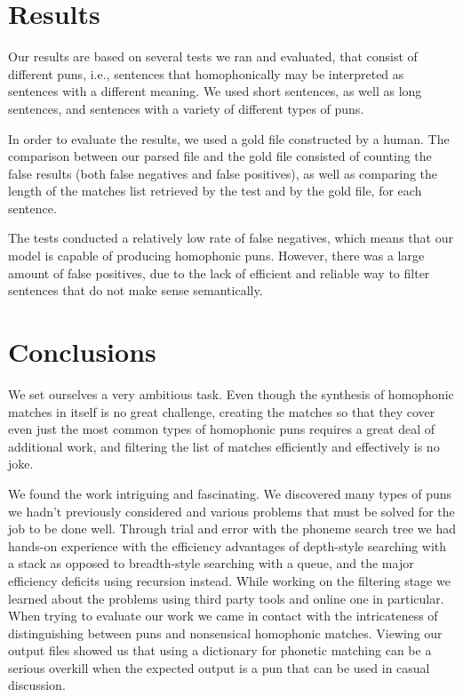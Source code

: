 \documentclass[11pt,a4paper]{article}
\begin{document}
\section{Results}
Our results are based on several tests we ran and evaluated, that consist of different puns, i.e., sentences that homophonically may be interpreted as sentences with a different meaning. We used short sentences, as well as long sentences, and sentences with a variety of different types of puns.

In order to evaluate the results, we used a gold file constructed by a human. The comparison between our parsed file and the gold file consisted of counting the false results (both false negatives and false positives), as well as comparing the length of the matches list retrieved by the test and by the gold file, for each sentence.

The tests conducted a relatively low rate of false negatives, which means that our model is capable of producing homophonic puns. However, there was a large amount of false positives, due to the lack of efficient and reliable way to filter sentences that do not make sense semantically.

\section{Conclusions}

We set ourselves a very ambitious task. Even though the synthesis of homophonic matches in itself is no great challenge, creating the matches so that they cover even just the most common types of homophonic puns requires a great deal of additional work, and filtering the list of matches efficiently and effectively is no joke.

We found the work intriguing and fascinating. We discovered many types of puns we hadn't previously considered and various problems that must be solved for the job to be done well. Through trial and error with the phoneme search tree we had hands-on experience with the efficiency advantages of depth-style searching with a stack as opposed to breadth-style searching with a queue, and the major efficiency deficits using recursion instead. While working on the filtering stage we learned about the problems using third party tools and online one in particular. When trying to evaluate our work we came in contact with the intricateness of distinguishing between puns and nonsensical homophonic matches. Viewing our output files showed us that using a dictionary for phonetic matching can be a serious overkill when the expected output is a pun that can be used in casual discussion.
\end{document}
